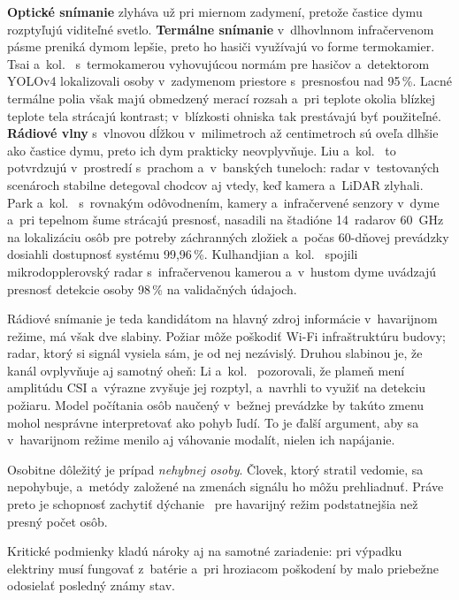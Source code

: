 \documentclass[10pt,twoside,a4paper]{article}
\begin{document}
\textbf{Optické snímanie} zlyháva už pri miernom zadymení, pretože častice dymu rozptyľujú viditeľné svetlo. \textbf{Termálne snímanie} v~dlhovlnnom infračervenom pásme preniká dymom lepšie, preto ho hasiči využívajú vo forme termokamier. Tsai a~kol.~\cite{tsai2022smoke} s~termokamerou vyhovujúcou normám pre hasičov a~detektorom YOLOv4 lokalizovali osoby v~zadymenom priestore s~presnosťou nad 95\,\%. Lacné termálne polia však majú obmedzený merací rozsah a~pri teplote okolia blízkej teplote tela strácajú kontrast; v~blízkosti ohniska tak prestávajú byť použiteľné. \textbf{Rádiové vlny} s~vlnovou dĺžkou v~milimetroch až centimetroch sú oveľa dlhšie ako častice dymu, preto ich dym prakticky neovplyvňuje. Liu a~kol.~\cite{liu2026radar4d} to potvrdzujú v~prostredí s~prachom a~v~banských tuneloch: radar v~testovaných scenároch stabilne detegoval chodcov aj vtedy, keď kamera a~LiDAR zlyhali. Park a~kol.~\cite{park2026distributed} s~rovnakým odôvodnením, kamery a~infračervené senzory v~dyme a~pri tepelnom šume strácajú presnosť, nasadili na štadióne 14~radarov 60~GHz na lokalizáciu osôb pre potreby záchranných zložiek a~počas 60-dňovej prevádzky dosiahli dostupnosť systému 99,96\,\%. Kulhandjian a~kol.~\cite{kulhandjian2023smoke} spojili mikrodopplerovský radar s~infračervenou kamerou a~v~hustom dyme uvádzajú presnosť detekcie osoby 98\,\% na validačných údajoch.

Rádiové snímanie je teda kandidátom na hlavný zdroj informácie v~havarijnom režime, má však dve slabiny. Požiar môže poškodiť Wi-Fi infraštruktúru budovy; radar, ktorý si signál vysiela sám, je od nej nezávislý. Druhou slabinou je, že kanál ovplyvňuje aj samotný oheň: Li a~kol.~\cite{li2021fire} pozorovali, že plameň mení amplitúdu CSI a~výrazne zvyšuje jej rozptyl, a~navrhli to využiť na detekciu požiaru. Model počítania osôb naučený v~bežnej prevádzke by takúto zmenu mohol nesprávne interpretovať ako pohyb ľudí. To je ďalší argument, aby sa v~havarijnom režime menilo aj váhovanie modalít, nielen ich napájanie.

Osobitne dôležitý je prípad \emph{nehybnej osoby}. Človek, ktorý stratil vedomie, sa nepohybuje, a~metódy založené na zmenách signálu ho môžu prehliadnuť. Práve preto je schopnosť zachytiť dýchanie~\cite{adib2015vital,weiss2020people} pre havarijný režim podstatnejšia než presný počet osôb.

Kritické podmienky kladú nároky aj na samotné zariadenie: pri výpadku elektriny musí fungovať z~batérie a~pri hroziacom poškodení by malo priebežne odosielať posledný známy stav.
\end{document}
